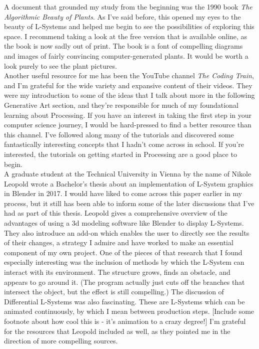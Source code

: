 \documentclass[12pt,twoside]{reedthesis}
\begin{document}
	A document that grounded my study from the beginning was the 1990 book \textit{The Algorithmic Beauty of Plants}. As I've said before, this opened my eyes to the beauty of L-Systems and helped me begin to see the possibilities of exploring this space. I recommend taking a look at the free version that is available online, as the book is now sadly out of print. The book is a font of compelling diagrams and images of fairly convincing computer-generated plants. It would be worth a look purely to see the plant pictures.\\
	
	Another useful resource for me has been the YouTube channel \textit{The Coding Train}, and I'm grateful for the wide variety and expansive content of their videos. They were my introduction to some of the ideas that I talk about more in the following Generative Art section, and they're responsible for much of my foundational learning about Processing. If you have an interest in taking the first step in your computer science journey, I would be hard-pressed to find a better resource than this channel. I've followed along many of the tutorials and discovered some fantastically interesting concepts that I hadn't come across in school. If you're interested, the tutorials on getting started in Processing are a good place to begin.\\
	
	A graduate student at the Technical University in Vienna by the name of Nikole Leopold wrote a Bachelor's thesis about an implementation of L-System graphics in Blender in 2017. I would have liked to come across this paper earlier in my process, but it still has been able to inform some of the later discussions that I've had as part of this thesis. Leopold gives a comprehensive overview of the advantages of using a 3d modeling software like Blender to display L-Systems. They also introduce an add-on which enables the user to directly see the results of their changes, a strategy I admire and have worked to make an essential component of my own project. One of the pieces of that research that I found especially interesting was the inclusion of methods by which the L-System can interact with its environment. The structure grows, finds an obstacle, and appears to go around it. (The program actually just cuts off the branches that intersect the object, but the effect is still compelling.) The discussion of Differential L-Systems was also fascinating. These are L-Systems which can be animated continuously, by which I mean between production steps. [Include some footnote about how cool this is - it's animation to a crazy degree!] I'm grateful for the resources that Leopold included as well, as they pointed me in the direction of more compelling sources.\\
	
\end{document}
